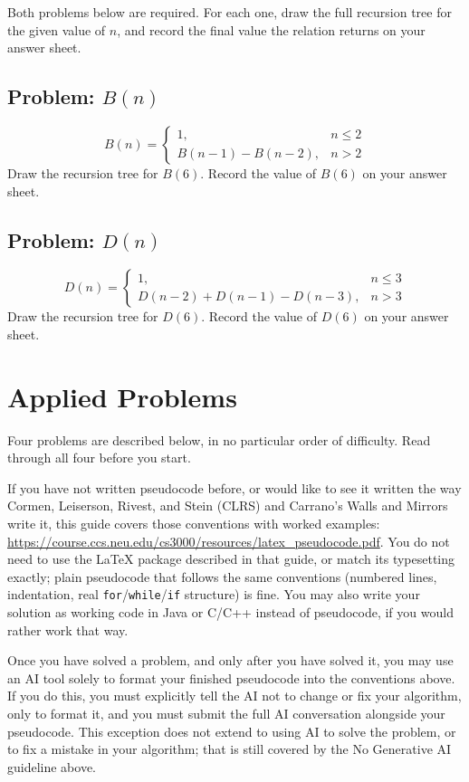 \documentclass[11pt]{article}
\begin{document}
Both problems below are required. For each one, draw the full recursion
tree for the given value of $n$, and record the final value the relation
returns on your answer sheet.

\subsection{Problem: $B(n)$}
\[
B(n) = \begin{cases}
1, & n \le 2 \\
B(n-1) - B(n-2), & n > 2
\end{cases}
\]
Draw the recursion tree for $B(6)$. Record the value of $B(6)$ on your
answer sheet.

\subsection{Problem: $D(n)$}
\[
D(n) = \begin{cases}
1, & n \le 3 \\
D(n-2) + D(n-1) - D(n-3), & n > 3
\end{cases}
\]
Draw the recursion tree for $D(6)$. Record the value of $D(6)$ on your
answer sheet.

\section{Applied Problems}

Four problems are described below, in no particular order of difficulty.
Read through all four before you start.

If you have not written pseudocode before, or would like to see it written
the way Cormen, Leiserson, Rivest, and Stein (CLRS) and Carrano's Walls and
Mirrors write it, this guide covers those conventions with worked examples:
\url{https://course.ccs.neu.edu/cs3000/resources/latex_pseudocode.pdf}. You
do not need to use the LaTeX package described in that guide, or match its
typesetting exactly; plain pseudocode that follows the same conventions
(numbered lines, indentation, real \texttt{for}/\texttt{while}/\texttt{if}
structure) is fine. You may also write your solution as working code in
Java or C/C++ instead of pseudocode, if you would rather work that way.

Once you have solved a problem, and only after you have solved it, you may
use an AI tool solely to format your finished pseudocode into the
conventions above. If you do this, you must explicitly tell the AI not to
change or fix your algorithm, only to format it, and you must submit the
full AI conversation alongside your pseudocode. This exception does not
extend to using AI to solve the problem, or to fix a mistake in your
algorithm; that is still covered by the No Generative AI guideline above.
\end{document}
